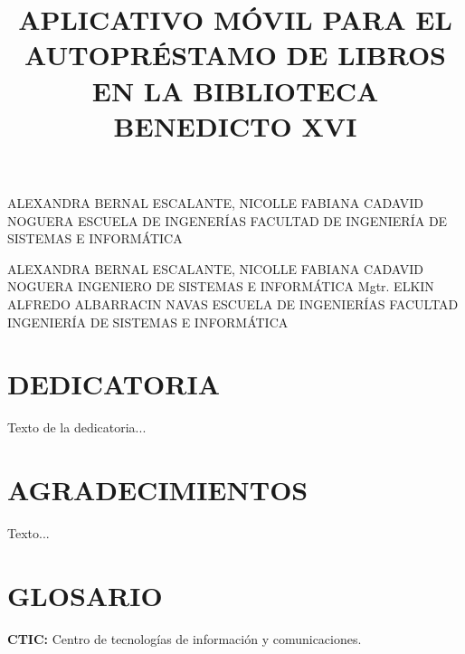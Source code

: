 \documentclass[spanish]{ieee_upb}
\title{APLICATIVO MÓVIL PARA EL AUTOPRÉSTAMO DE LIBROS EN LA BIBLIOTECA BENEDICTO XVI}
\date{\the\year}
\begin{document}
\setlength{\headheight}{15pt}

{ALEXANDRA BERNAL ESCALANTE, NICOLLE FABIANA CADAVID NOGUERA}
{ESCUELA DE INGENERÍAS}
{FACULTAD DE INGENIERÍA DE SISTEMAS E INFORMÁTICA}

\newpage
{}
{ALEXANDRA BERNAL ESCALANTE, NICOLLE FABIANA CADAVID NOGUERA}
{INGENIERO DE SISTEMAS E INFORMÁTICA}
{Mgtr. ELKIN ALFREDO ALBARRACIN NAVAS}
{ESCUELA DE INGENIERÍAS}
{FACULTAD INGENIERÍA DE SISTEMAS E INFORMÁTICA}
\newpage
\section*{DEDICATORIA}
Texto de la dedicatoria...

\clearpage
\section*{AGRADECIMIENTOS}
Texto...

\clearpage
\renewcommand\contentsname{\hfill\normalfont\bfseries CONTENIDO\hfill}
\tableofcontents

\renewcommand{\thetable}{\Roman{table}}


\makeatletter
\renewcommand{\numberline}[1]{%
  \stepcounter{tabindexcounter}%
  Tabla~\arabic{tabindexcounter}~%
}
\makeatother


\newpage
{} 
\renewcommand\listtablename{\hfill\normalfont\bfseries LISTA DE TABLAS\hfill}
\listoftables

\newpage
\renewcommand\listfigurename{\hfill\normalfont\bfseries LISTA DE FIGURAS\hfill}
\listoffigures

\clearpage





\newpage
\section*{GLOSARIO}
\textbf{CTIC: } Centro de tecnologías de información y comunicaciones.
\end{document}
